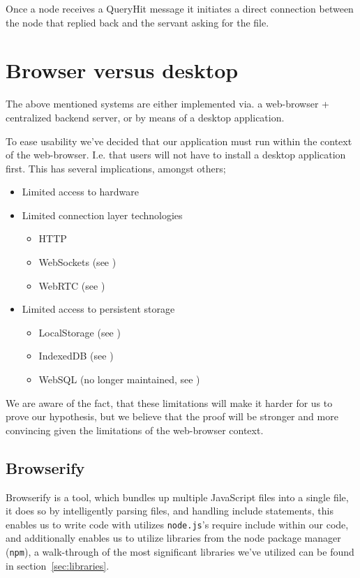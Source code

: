 Once a node receives a QueryHit message it initiates a direct connection between the node that replied back and the servant asking for the file.

\section{Browser versus desktop}
The above mentioned systems are either implemented via. a web-browser +
centralized backend server, or by means of a desktop application.

To ease usability we've decided that our application must run within the
context of the web-browser. I.e. that users will not have to install a desktop
application first. This has several implications, amongst others;
\begin{itemize}
\item Limited access to hardware
\item Limited connection layer technologies
    \begin{itemize}
        \item \acs{HTTP}
        \item WebSockets (see \citep{RFC6455})
        \item WebRTC (see \citep{WebRTC})
    \end{itemize}
\item Limited access to persistent storage
    \begin{itemize}
        \item LocalStorage (see \citep{WebStorage})
        \item IndexedDB (see \citep{IndexedDB})
        \item WebSQL (no longer maintained, see \citep{WebSQL})
    \end{itemize}
\end{itemize}
We are aware of the fact, that these limitations will make it harder for us to
prove our hypothesis, but we believe that the proof will be stronger and more
convincing given the limitations of the web-browser context.

\subsection{Browserify}
Browserify is a tool, which bundles up multiple JavaScript files into a single
file, it does so by intelligently parsing files, and handling include
statements, this enables us to write code with utilizes \verb|node.js|'s require
include within our code, and additionally enables us to utilize libraries from
the node package manager (\verb|npm|), a walk-through of the most significant 
libraries we've utilized can be found in section~\ref{sec:libraries}.

